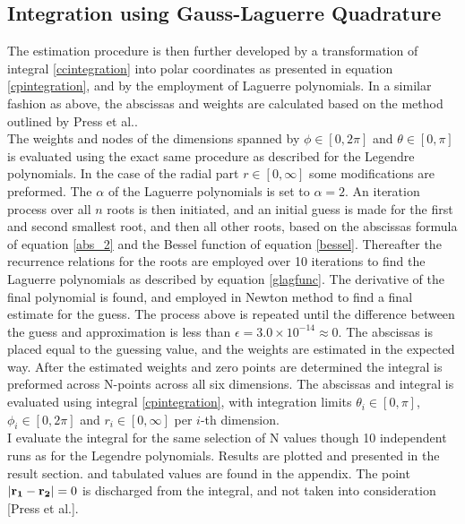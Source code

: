 \documentclass[%
reprint,nofootinbib,
amsmath,amssymb,
aps,
]{revtex4-1}
\begin{document}
\subsection{Integration using Gauss-Laguerre Quadrature} \noindent 
The estimation procedure is then further developed by a transformation of integral \ref{ccintegration} into polar coordinates as presented in equation \ref{cpintegration}, and by the employment of Laguerre polynomials. In a similar fashion as above, the abscissas and weights are calculated based on the method outlined by Press et al.. \\ \indent 
The weights and nodes of the dimensions spanned by $\phi\in [0,2\pi]$ and $\theta\in[0,\pi]$ is evaluated using the exact same procedure as described for the Legendre polynomials. In the case of the radial part $r\in[0,\infty]$ some modifications are preformed. The $\alpha$ of the Laguerre polynomials is set to $\alpha = 2$. An iteration process over all $n$ roots is then initiated, and an initial guess is made for the first and second smallest root, and then all other roots, based on the abscissas formula of equation \ref{abs_2} and the Bessel function of equation \ref{bessel}. Thereafter the recurrence relations for the roots are employed over 10 iterations  to find the Laguerre polynomials as described by equation \ref{glagfunc}. The derivative of the final polynomial is found, and employed in Newton method to find a final estimate for the guess. The process above is repeated until the difference between the guess and approximation is less than $\epsilon = 3.0\times 10^{-14} \approx 0$. The abscissas is placed equal to the guessing value, and the weights are estimated in the expected way. After the estimated weights and zero points are determined the integral is preformed across N-points across all six dimensions. The abscissas and integral is evaluated using integral \ref{cpintegration}, with integration limits $\theta_i \in [0,\pi]$, $\phi_i \in [0,2\pi]$ and $r_i\in[0,\infty]$ per $i$-th dimension. \\ \indent I evaluate the integral for the same selection of N values though 10 independent runs as for the Legendre polynomials. Results are plotted and presented in the result section. and tabulated values are found in the appendix. The point $\abs{\mathbf{r_1} -\mathbf{r_2}} = 0$ is discharged from the integral, and not taken into consideration [Press et al.].
\end{document}
